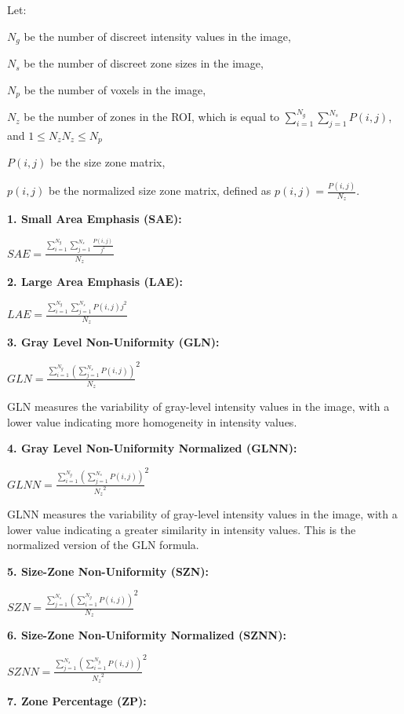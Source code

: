 Let:

 $N_{g}$ be the number of discreet intensity values in the image, 

    $N_{s}$ be the number of discreet zone sizes in the image,

  $N_{p}$ be the number of voxels in the image,

$N_{z}$ be the number of zones in the ROI, which is equal to $\sum _{i=1}^{N_{g}}\sum _{j=1}^{N_{s}}P\left(i,j\right)$, and $1\leq N_{z}N_{z}\leq N_{p}$

$P\left(i,j\right)$ be the size zone matrix,

$p\left(i,j\right)$ be the normalized size zone matrix, defined as $p\left(i,j\right)=\frac{P\left(i,j\right)}{N_{z}}$.

\textbf{1. Small Area Emphasis (SAE):}

$SAE=\frac{\sum _{i=1}^{N_{g}}\sum _{j=1}^{N_{s}}\frac{P\left(i,j\right)}{j^{2}}}{N_{z}}$

\textbf{2. Large Area Emphasis (LAE):}

$LAE=\frac{\sum _{i=1}^{N_{g}}\sum _{j=1}^{N_{s}}P\left(i,j\right)j^{2}}{N_{z}}$

\textbf{3. Gray Level Non-Uniformity (GLN):}

$GLN=\frac{\sum _{i=1}^{N_{g}}\left(\sum _{j=1}^{N_{s}}P\left(i,j\right)\right)}{N_{z}}^{2}$

GLN measures the variability of gray-level intensity values in the image, with a lower value indicating more homogeneity in intensity values.

\textbf{4. Gray Level Non-Uniformity Normalized (GLNN):}

$GLNN=\frac{\sum _{i=1}^{N_{g}}\left(\sum _{j=1}^{N_{s}}P\left(i,j\right)\right)}{{N_{z}}^{2}}^{2}$

GLNN measures the variability of gray-level intensity values in the image, with a lower value indicating a greater similarity in intensity values. This is the normalized version of the GLN formula.

\textbf{5. Size-Zone Non-Uniformity (SZN):}

$SZN=\frac{\sum _{j=1}^{N_{s}}\left(\sum _{i=1}^{N_{g}}P\left(i,j\right)\right)}{N_{z}}^{2}$

\textbf{6. Size-Zone Non-Uniformity Normalized (SZNN):}

$SZNN=\frac{\sum _{j=1}^{N_{s}}\left(\sum _{i=1}^{N_{g}}P\left(i,j\right)\right)}{{N_{z}}^{2}}^{2}$

\textbf{7. Zone Percentage (ZP):}

